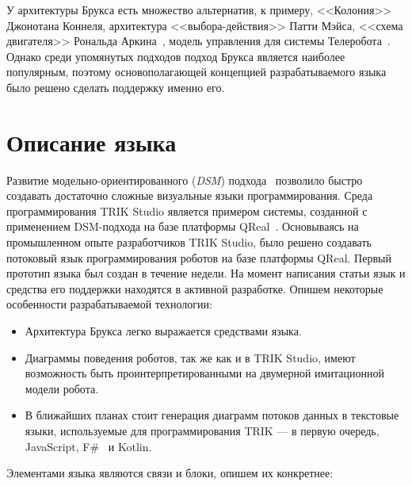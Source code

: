 \documentclass[conference]{IEEEtran}
\begin{document}
	У архитектуры Брукса есть множество альтернатив, к примеру, <<Колония>> Джонотана Коннеля, архитектура <<выбора-действия>> Патти Мэйса, <<схема двигателя>> Рональда Аркина~\cite{simpson2009toward}, модель управления для системы Телеробота~\cite{albus1989nasa}. Однако среди упомянутых подходов подход Брукса является наиболее популярным, поэтому основополагающей концепцией разрабатываемого языка было решено сделать поддержку именно его.


\section{Описание языка}
\label{sec:lang}
Развитие модельно-ориентированного (\textit{DSM}) подхода~\cite{koznov2008} позволило быстро создавать достаточно сложные визуальные языки программирования. Среда программирования TRIK Studio является примером системы, созданной с применением DSM-подхода на базе платформы QReal~\cite{qrealMeta,kuzenkova2013qreal}. Основываясь на промышленном опыте разработчиков TRIK Studio, было решено создавать потоковый язык программирования роботов на базе платформы QReal. Первый прототип языка был создан в течение недели. На момент написания статьи язык и средства его поддержки находятся в активной разработке. Опишем некоторые особенности разрабатываемой технологии:

\begin{itemize}
\item Архитектура Брукса легко выражается средствами языка.
\item Диаграммы поведения роботов, так же как и в TRIK Studio, имеют возможность быть проинтерпретированными на двумерной имитационной модели робота. 
\item В ближайших планах стоит генерация диаграмм потоков данных в текстовые языки, используемые для программирования TRIK --- в первую очередь, JavaScript, F\#~\cite{kirsanov2014robotics} и Kotlin.
\end{itemize}

Элементами языка являются связи и блоки, опишем их конкретнее:
\end{document}
